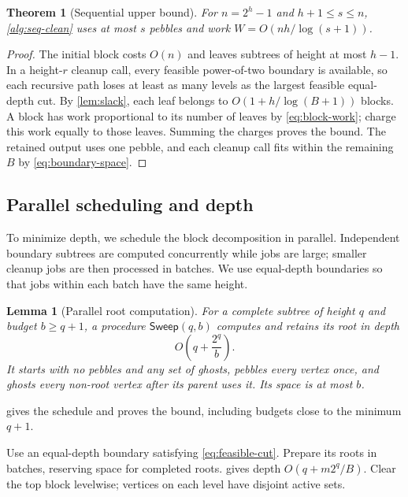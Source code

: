 \documentclass[11pt]{article}
\newtheorem{theorem}{Theorem}[section]
\newtheorem{lemma}[lemma]{Lemma}
\theoremstyle{definition}
\theoremstyle{remark}
\newcommand{\Sweep}{\mathsf{Sweep}}
\begin{document}
\begin{theorem}[Sequential upper bound]
\label{thm:seq-upper}
For $n=2^h-1$ and $h+1\le s\le n$, \cref{alg:seq-clean} uses at most $s$ pebbles and work $W=O(nh/\log(s+1))$.
\end{theorem}
\begin{proof}
The initial block costs $O(n)$ and leaves subtrees of height at most $h-1$. In a height-$r$ cleanup call, every feasible power-of-two boundary is available, so each recursive path loses at least as many levels as the largest feasible equal-depth cut. By \cref{lem:slack}, each leaf belongs to $O(1+h/\log(B+1))$ blocks. A block has work proportional to its number of leaves by \cref{eq:block-work}; charge this work equally to those leaves. Summing the charges proves the bound. The retained output uses one pebble, and each cleanup call fits within the remaining $B$ by \cref{eq:boundary-space}.
\end{proof}

\subsection{Parallel scheduling and depth}
\label{sec:parallel-upper}

To minimize depth, we schedule the block decomposition in parallel. Independent boundary subtrees are computed concurrently while jobs are large; smaller cleanup jobs are then processed in batches. We use equal-depth boundaries so that jobs within each batch have the same height.

\begin{lemma}[Parallel root computation]
\label{lem:sweep}
For a complete subtree of height $q$ and budget $b\ge q+1$, a procedure $\Sweep(q,b)$ computes and retains its root in depth
\begin{equation}
O\!\left(q+\frac{2^q}{b}\right).
\label{eq:sweep}
\end{equation}
It starts with no pebbles and any set of ghosts, pebbles every vertex once, and ghosts every non-root vertex after its parent uses it. Its space is at most $b$.
\end{lemma}

 gives the schedule and proves the bound, including budgets close to the minimum $q+1$.

Use an equal-depth boundary satisfying \cref{eq:feasible-cut}. Prepare its roots in batches, reserving space for completed roots.  gives depth $O(q+m2^q/B)$. Clear the top block levelwise; vertices on each level have disjoint active sets.
\end{document}

